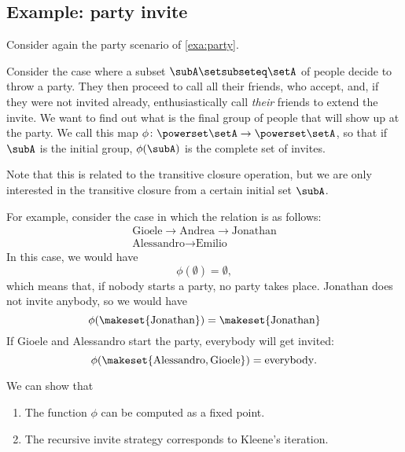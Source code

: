 \subsection{Example: party invite}

Consider again the party scenario of \cref{exa:party}.

Consider the case where a subset $\subA \setsubseteq \setA$ of people decide to throw a party.
They then proceed to call all their friends, who accept, and,
if they were not invited already, enthusiastically call \emph{their} friends to extend the invite.
We want to find out what is the final group of people that will show up at the party.
We call this map $\phi \colon \powerset \setA \to \powerset \setA$, so that if $\subA$ is the initial group, $\phi(\subA)$ is the complete set of invites.

Note that this is related to the transitive closure operation, but we are only interested in the transitive closure from a certain initial set $\subA$.

For example, consider the case in which the relation is as follows:
\begin{align}
    \text{Gioele} \to \text{Andrea} \to \text{Jonathan} \\
    \text{Alessandro} \to \text{Emilio}
\end{align}
In this case, we would have
\begin{equation}
    \phi(\emptyset) = \emptyset,
\end{equation}
which means that, if nobody starts a party, no party takes place.
Jonathan does not invite anybody, so we would have
\begin{equation}
    \phi(\makeset{\text{Jonathan}}) = \makeset{\text{Jonathan}}
\end{equation}
If Gioele and Alessandro start the party, everybody will get invited:
\begin{equation}
    \phi(\makeset{\text{Alessandro}, \text{Gioele}}) = \text{everybody}.
\end{equation}

We can show that
\begin{enumerate}
    \item The function $\phi$ can be computed as a fixed point.
    \item The recursive invite strategy corresponds to Kleene's iteration.
\end{enumerate}

